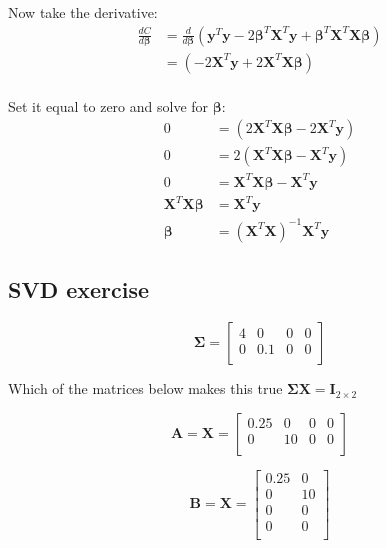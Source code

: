 \documentclass[11pt]{article}
\newcommand\xmtx{\boldsymbol{X}}
\newcommand\betavec{\boldsymbol{\beta}}
\newcommand\yvec{\boldsymbol{y}}
\newcommand\sigmtx{\boldsymbol{\Sigma}}
\newcommand{\mtx}[1]{\boldsymbol{#1}}
\begin{document}
Now take the derivative:
\begin{equation}
    \begin{aligned}
        \frac{dC}{d\betavec} &= \frac{d}{d\betavec} 
            (\yvec^T \yvec  - 2 \betavec^T \xmtx^T \yvec + \betavec^T \xmtx^T \xmtx \betavec )\\
            &= (- 2 \xmtx^T \yvec + 2 \xmtx^T \xmtx \betavec )\\
    \end{aligned}
\end{equation}

Set it equal to zero and solve for $\betavec$:
\begin{equation}
    \begin{aligned}
        0 &= (2 \xmtx^T \xmtx \betavec - 2 \xmtx^T \yvec  ) \\
        0 &= 2( \xmtx^T \xmtx \betavec -\xmtx^T \yvec) \\
        0 &=  \xmtx^T \xmtx \betavec -\xmtx^T \yvec \\
        \xmtx^T \xmtx \betavec & = \xmtx^T \yvec \\
        \betavec &= (\xmtx^T \xmtx )^{-1} \xmtx^T \yvec 
    \end{aligned}
\end{equation}

\subsection{ SVD exercise }

\begin{equation}
    \sigmtx =  
    \begin{bmatrix}
        4 & 0   & 0 & 0 \\
        0 & 0.1 & 0 & 0 \\
    \end{bmatrix}
\end{equation}

Which of the matrices below makes this true $\sigmtx \xmtx = \mtx{I}_{2 \times 2}$

\begin{equation}
    \mtx{A} = \xmtx = 
    \begin{bmatrix}
        0.25 & 0   & 0 & 0 \\
        0 & 10 & 0 & 0 \\
    \end{bmatrix}
\end{equation}

\begin{equation}
    \mtx{B} = \xmtx = 
    \begin{bmatrix}
        0.25 & 0 \\
        0 & 10  \\
        0 & 0 \\
        0 & 0 \\
    \end{bmatrix}
\end{equation}
\end{document}
